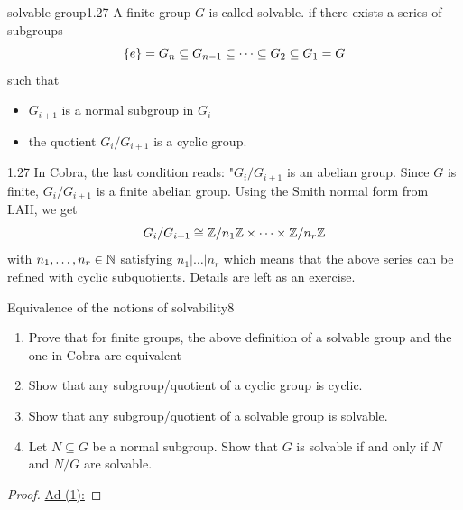 \documentclass[twoside = false,	%
		headsepline,		%
		parskip = true,
		]{scrbook}						%
\begin{document}
        \begin{definition}{solvable group}{1.27}
            A finite group $G$ is called solvable. if there exists a series of subgroups
            $$\left\{ e\right\} = G_n\subseteq G_{n-1}\subseteq \dots \subseteq G_2\subseteq G_1= G$$
            such that \begin{itemize}
                \item $G_{i+1}$ is a normal subgroup in $G_i$
                \item the quotient $G_i/G_{i+1}$ is a cyclic group.
            \end{itemize}
        \end{definition}
        \begin{remark}{}{1.27}
            In Cobra, the last condition reads: "$G_i/G_{i+1}$ is an abelian group. Since $G$ is finite, $G_i/G_{i+1}$ is a finite abelian group. Using the Smith normal form from LAII, we get
            $$G_i/G_{i+1} \cong \mathbb Z/n_1\mathbb Z \times \dots \times \mathbb Z/n_r\mathbb Z$$ with $n_1,\dots, n_r\in\mathbb N$ satisfying $n_1|\dots|n_r$ which means that the above series can be refined with cyclic subquotients. Details are left as an exercise.
        \end{remark}
        \begin{exercise}{Equivalence of the notions of solvability}{8}
            \begin{enumerate}
                \item Prove that for finite groups, the above definition of a solvable group and the one in Cobra are equivalent
                \item Show that any subgroup/quotient of a cyclic group is cyclic.
                \item Show that any subgroup/quotient of a solvable group is solvable.
                \item Let $N\subseteq G$ be a normal subgroup. Show that $G$ is solvable if and only if $N$ and $N/G$ are solvable.
            \end{enumerate}
        \end{exercise}

         \begin{proof}
             \underline{Ad (1):}
         \end{proof}
        
\end{document}
